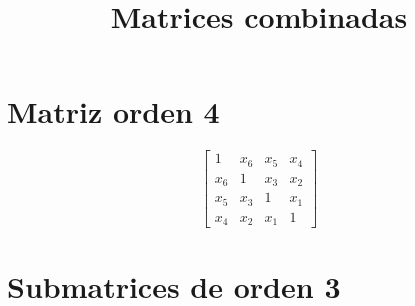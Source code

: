 \documentclass[12pt]{article}
\begin{document}
\title{Matrices combinadas}
\maketitle

\section*{Matriz orden 4}

$$\left[\begin{matrix}1 & x_{6} & x_{5} & x_{4}\\x_{6} & 1 & x_{3} & x_{2}\\x_{5} & x_{3} & 1 & x_{1}\\x_{4} & x_{2} & x_{1} & 1\end{matrix}\right]$$

\section*{Submatrices de orden 3}
\end{document}
